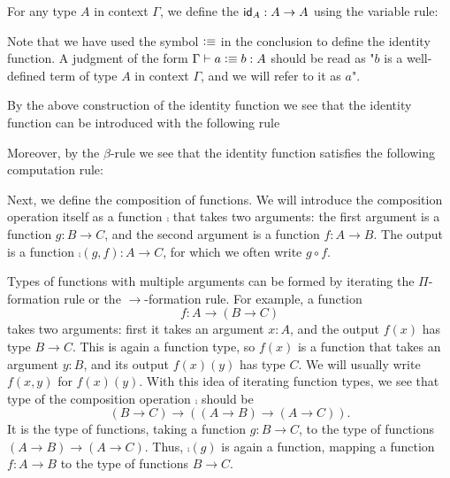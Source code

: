 \begin{defn}
For any type $A$ in context $\Gamma$, we define the  $\idfunc[A]:A\to A$ using the variable rule:
\begin{prooftree}
\end{prooftree}
\end{defn}

Note that we have used the symbol $\defeq$ in the conclusion to define the identity function. A judgment of the form $\Gamma\vdash a\defeq b:A$ should be read as "$b$ is a well-defined term of type $A$ in context $\Gamma$, and we will refer to it as $a$".

By the above construction of the identity function we see that the identity function can be introduced with the following rule
\begin{prooftree}
\end{prooftree}
Moreover, by the $\beta$-rule we see that the identity function satisfies the following computation rule:
\begin{prooftree}
\end{prooftree}

Next, we define the composition of functions. We will introduce the composition operation itself as a function $\comp$ that takes two arguments: the first argument is a function $g:B\to C$, and the second argument is a function $f:A\to B$. The output is a function $\comp(g,f):A\to C$, for which we often write $g\circ f$.

Types of functions with multiple arguments can be formed by iterating the $\Pi$-formation rule or the $\to$-formation rule. For example, a function
\begin{equation*}
  f:A\to (B\to C)
\end{equation*}
takes two arguments: first it takes an argument $x:A$, and the output $f(x)$ has type $B\to C$. This is again a function type, so $f(x)$ is a function that takes an argument $y:B$, and its output $f(x)(y)$ has type $C$. We will usually write $f(x,y)$ for $f(x)(y)$. With this idea of iterating function types, we see that type of the composition operation $\comp$ should be
\begin{equation*}
  (B\to C)\to ((A\to B)\to (A\to C)).
\end{equation*}
It is the type of functions, taking a function $g:B\to C$, to the type of functions $(A\to B)\to (A\to C)$. Thus, $\comp(g)$ is again a function, mapping a function $f:A\to B$ to the type of functions $B\to C$. 

